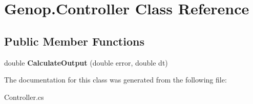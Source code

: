 \hypertarget{classGenop_1_1Controller}{}\section{Genop.\+Controller Class Reference}
\label{classGenop_1_1Controller}
\subsection*{Public Member Functions}
\begin{DoxyCompactItemize}
\item 
double {\bfseries Calculate\+Output} (double error, double dt)\hypertarget{classGenop_1_1Controller_ae5fd8ff66bb482c175bd02aa2366a336}{}\label{classGenop_1_1Controller_ae5fd8ff66bb482c175bd02aa2366a336}

\end{DoxyCompactItemize}


The documentation for this class was generated from the following file\+:\begin{DoxyCompactItemize}
\item 
Controller.\+cs\end{DoxyCompactItemize}

